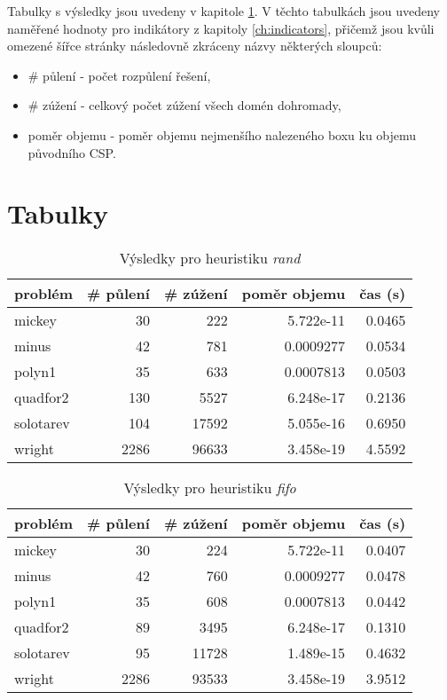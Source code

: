 {Tabulky s výsledky jsou uvedeny v kapitole \ref{ch:resultTables}. V těchto tabulkách jsou uvedeny naměřené hodnoty pro indikátory z kapitoly \ref{ch:indicators}, přičemž jsou kvůli omezené šířce stránky následovně zkráceny názvy některých sloupců:


\begin{itemize}
    \item \# půlení - počet rozpůlení řešení,
    \item \# zúžení - celkový počet zúžení všech domén dohromady,
    \item poměr objemu - poměr objemu nejmenšího nalezeného boxu ku objemu původního CSP.
\end{itemize}


\section{Tabulky}
\label{ch:resultTables}

\begin{table}[H]
\centering
\begin{tabular}{lrrrr}
\hline
problém & \# půlení & \# zúžení & poměr objemu & čas (s) \\ \hline
mickey & 30 & 222 & 5.722e-11 & 0.0465 \\
minus & 42 & 781 & 0.0009277 & 0.0534 \\
polyn1 & 35 & 633 & 0.0007813 & 0.0503 \\
quadfor2 & 130 & 5527 & 6.248e-17 & 0.2136 \\
solotarev & 104 & 17592 & 5.055e-16 & 0.6950 \\
wright & 2286 & 96633 & 3.458e-19 & 4.5592 \\
\end{tabular}
\caption{Výsledky pro heuristiku \emph{rand}}
\label{rand}
\end{table}



\begin{table}[H]
\centering
\begin{tabular}{lrrrr}
\hline
problém & \# půlení & \# zúžení & poměr objemu & čas (s) \\ \hline
mickey & 30 & 224 & 5.722e-11 & 0.0407 \\
minus & 42 & 760 & 0.0009277 & 0.0478 \\
polyn1 & 35 & 608 & 0.0007813 & 0.0442 \\
quadfor2 & 89 & 3495 & 6.248e-17 & 0.1310 \\
solotarev & 95 & 11728 & 1.489e-15 & 0.4632 \\
wright & 2286 & 93533 & 3.458e-19 & 3.9512 \\
\end{tabular}
\caption{Výsledky pro heuristiku \emph{fifo}}
\label{fifo}
\end{table}



}
